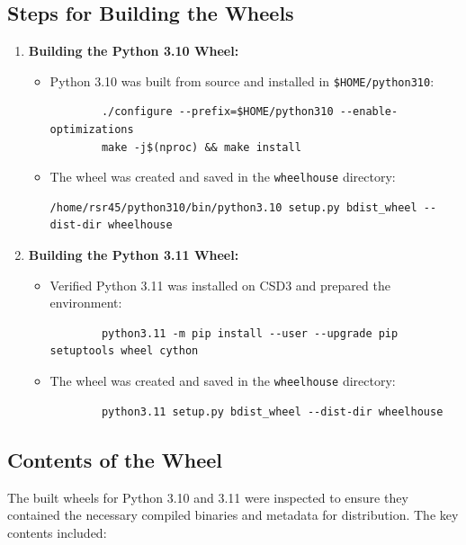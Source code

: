 \documentclass[a4paper,12pt]{article}
\begin{document}
\subsection{Steps for Building the Wheels}
\begin{enumerate}
    \item \textbf{Building the Python 3.10 Wheel:}
    \begin{itemize}
        \item Python 3.10 was built from source and installed in \texttt{\$HOME/python310}:
        \begin{verbatim}
        ./configure --prefix=$HOME/python310 --enable-optimizations
        make -j$(nproc) && make install
        \end{verbatim}
        \item The wheel was created and saved in the \texttt{wheelhouse} directory:
        \begin{verbatim}
/home/rsr45/python310/bin/python3.10 setup.py bdist_wheel --dist-dir wheelhouse
        \end{verbatim}
    \end{itemize}

    \item \textbf{Building the Python 3.11 Wheel:}
    \begin{itemize}
        \item Verified Python 3.11 was installed on CSD3 and prepared the environment:
        \begin{verbatim}
        python3.11 -m pip install --user --upgrade pip setuptools wheel cython
        \end{verbatim}
        \item The wheel was created and saved in the \texttt{wheelhouse} directory:
        \begin{verbatim}
        python3.11 setup.py bdist_wheel --dist-dir wheelhouse
        \end{verbatim}
    \end{itemize}
\end{enumerate}

\subsection{Contents of the Wheel}
The built wheels for Python 3.10 and 3.11 were inspected to ensure they contained the necessary compiled binaries and metadata for distribution. The key contents included:
\end{document}
